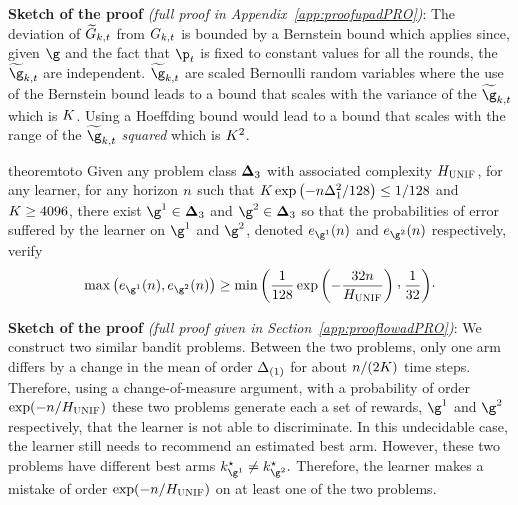 \noindent\textbf{Sketch of the proof} \textit{(full proof in 
	Appendix~\ref{app:proofupadPRO})}:
The deviation of 
$\widetilde{G}_{k,t}$ from $G_{k,t}$ is bounded by 
a Bernstein bound which applies  since, given 
$\gainVector$ and the fact that $\learnerDist_t$ is fixed to 
constant values for all the rounds, the $\estGainVector_{k,t}$ 
are independent.  $\estGainVector_{k,t}$ are scaled 
Bernoulli random variables where the use of the Bernstein 
bound leads to a bound that scales with the 
variance of the $\estGainVector_{k,t}$ which is $K$. Using a  Hoeffding bound would lead to  a 
bound that scales with the range of the $\estGainVector_{k,t}$ \emph{squared}
which is $K^2$. %
%
\begin{restatable}[\textcolor{titleTh}{Lower bound for the adversarial problem}]{theorem}{toto}\label{th:LOWadPRO}
	Given any problem class $\boldsymbol{\Delta}_{3}$ with associated complexity
	$H_{{\normalfont \textsc{UNIF}}}$,    
	for any learner, for any horizon $n$ such that    
	$K\exp\left( -n\Delta^2_1 /128\right)\leq 1/128$ and $K\geq 4096$, there exist 
	$\gainVector^1\in\Gaps_{3}$ and $\gainVector^2\in\Gaps_{3}$ so that  
	the  probabilities of error suffered by the learner on 
	$\gainVector^1$ and $\gainVector^2$, denoted $\ProErr_{\gainVector^1}(n)$ 
	and  $\ProErr_{\gainVector^2}(n)$ respectively, verify
	\[
	\max\left(\ProErr_{\gainVector^1}(n),\ProErr_{\gainVector^2}(n)\right)
	\geq
	\min\left(
	\frac{1}{128}\exp\left(-\frac{32\timeHorizon}{\complexityUnif}\right)\CommaBin
	\frac{1}{32}
	\right)\!\cdot
	\]     
\end{restatable}
%
\noindent\textbf{Sketch of the proof} \textit{(full proof given 
	in Section~\ref{app:prooflowadPRO})}:
We construct two similar bandit problems. Between the two 
problems, only one arm differs by a change in the mean of 
order $\Delta_{(1)}$ for about $n/(2K)$ 
time steps. Therefore, using a change-of-measure argument, 
with a probability of order $\exp(-n/H_{{\normalfont \textsc{UNIF}}})$ these two problems generate each a 
set of rewards,  $\gainVector^1$ and 
$\gainVector^2$ respectively, that the learner is not able to 
discriminate. In this undecidable case,  the learner 
still needs to recommend an estimated best arm.
However, these two problems have different best arms 
$\bestArm_{\gainVector^1}\neq\bestArm_{\gainVector^2}.$ 
Therefore, the learner makes a mistake of order 
$\exp(-n/H_{{\normalfont \textsc{UNIF}}})$ on 
at least one of the two problems.

